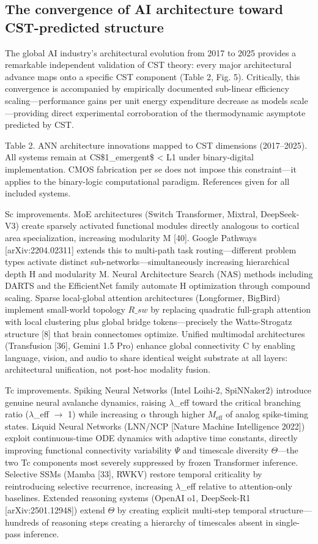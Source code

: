 \documentclass[a4paper,12pt]{article}
\begin{document}
\subsection{The convergence of AI architecture toward CST-predicted structure}

The global AI industry's architectural evolution from 2017 to 2025 provides a remarkable independent validation of CST theory: every major architectural advance maps onto a specific CST component (Table 2, Fig. 5). Critically, this convergence is accompanied by empirically documented sub-linear efficiency scaling---performance gains per unit energy expenditure decrease as models scale---providing direct experimental corroboration of the thermodynamic asymptote predicted by CST.


Table 2. ANN architecture innovations mapped to CST dimensions (2017--2025). All systems remain at CS\$1_{emergent}\$ < L1 under binary-digital implementation. CMOS fabrication per se does not impose this constraint---it applies to the binary-logic computational paradigm. References given for all included systems.


Sc improvements. MoE architectures (Switch Transformer, Mixtral, DeepSeek-V3) create sparsely activated functional modules directly analogous to cortical area specialization, increasing modularity M [40]. Google Pathways [arXiv:2204.02311] extends this to multi-path task routing---different problem types activate distinct sub-networks---simultaneously increasing hierarchical depth H and modularity M. Neural Architecture Search (NAS) methods including DARTS and the EfficientNet family automate H optimization through compound scaling. Sparse local-global attention architectures (Longformer, BigBird) implement small-world topology $R\_{sw}$ by replacing quadratic full-graph attention with local clustering plus global bridge tokens---precisely the Watts-Strogatz structure [8] that brain connectomes optimize. Unified multimodal architectures (Transfusion [36], Gemini 1.5 Pro) enhance global connectivity C by enabling language, vision, and audio to share identical weight substrate at all layers: architectural unification, not post-hoc modality fusion.


Tc improvements. Spiking Neural Networks (Intel Loihi-2, SpiNNaker2) introduce genuine neural avalanche dynamics, raising $\lambda$_eff toward the critical branching ratio ($\lambda$_eff $\rightarrow$ 1) while increasing $\alpha$ through higher $M_{\text{eff}}$ of analog spike-timing states. Liquid Neural Networks (LNN/NCP [Nature Machine Intelligence 2022]) exploit continuous-time ODE dynamics with adaptive time constants, directly improving functional connectivity variability $\Psi$ and timescale diversity $\Theta$—the two Tc components most severely suppressed by frozen Transformer inference. Selective SSMs (Mamba [33], RWKV) restore temporal criticality by reintroducing selective recurrence, increasing $\lambda$_eff relative to attention-only baselines. Extended reasoning systems (OpenAI o1, DeepSeek-R1 [arXiv:2501.12948]) extend $\Theta$ by creating explicit multi-step temporal structure---hundreds of reasoning steps creating a hierarchy of timescales absent in single-pass inference.
\end{document}
